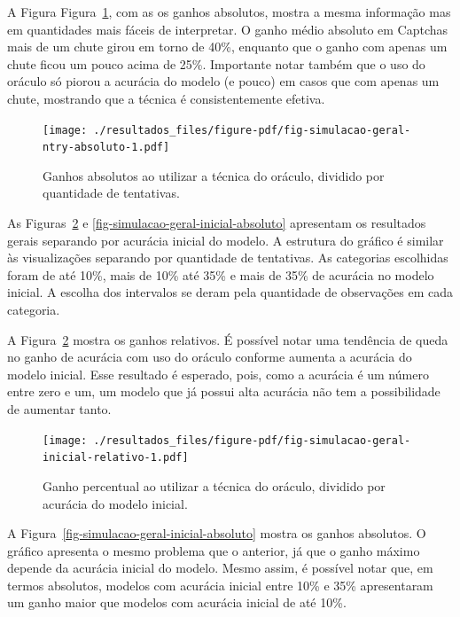 \documentclass[12pt,twoside,brazilian]{book}
\begin{document}
A Figura Figura~\ref{fig-simulacao-geral-ntry-absoluto}, com as os
ganhos absolutos, mostra a mesma informação mas em quantidades mais
fáceis de interpretar. O ganho médio absoluto em Captchas mais de um
chute girou em torno de 40\%, enquanto que o ganho com apenas um chute
ficou um pouco acima de 25\%. Importante notar também que o uso do
oráculo só piorou a acurácia do modelo (e pouco) em casos que com apenas
um chute, mostrando que a técnica é consistentemente efetiva.

\begin{figure}

{\centering \texttt{[image: ./resultados\_files/figure-pdf/fig-simulacao-geral-ntry-absoluto-1.pdf]}

}

\caption{\label{fig-simulacao-geral-ntry-absoluto}Ganhos absolutos ao
utilizar a técnica do oráculo, dividido por quantidade de tentativas.}

\end{figure}

As Figuras~\ref{fig-simulacao-geral-inicial-relativo} e
\ref{fig-simulacao-geral-inicial-absoluto} apresentam os resultados
gerais separando por acurácia inicial do modelo. A estrutura do gráfico
é similar às visualizações separando por quantidade de tentativas. As
categorias escolhidas foram de até 10\%, mais de 10\% até 35\% e mais de
35\% de acurácia no modelo inicial. A escolha dos intervalos se deram
pela quantidade de observações em cada categoria.

A Figura~\ref{fig-simulacao-geral-inicial-relativo} mostra os ganhos
relativos. É possível notar uma tendência de queda no ganho de acurácia
com uso do oráculo conforme aumenta a acurácia do modelo inicial. Esse
resultado é esperado, pois, como a acurácia é um número entre zero e um,
um modelo que já possui alta acurácia não tem a possibilidade de
aumentar tanto.

\begin{figure}

{\centering \texttt{[image: ./resultados\_files/figure-pdf/fig-simulacao-geral-inicial-relativo-1.pdf]}

}

\caption{\label{fig-simulacao-geral-inicial-relativo}Ganho percentual ao
utilizar a técnica do oráculo, dividido por acurácia do modelo inicial.}

\end{figure}

A Figura~\ref{fig-simulacao-geral-inicial-absoluto} mostra os ganhos
absolutos. O gráfico apresenta o mesmo problema que o anterior, já que o
ganho máximo depende da acurácia inicial do modelo. Mesmo assim, é
possível notar que, em termos absolutos, modelos com acurácia inicial
entre 10\% e 35\% apresentaram um ganho maior que modelos com acurácia
inicial de até 10\%.
\end{document}
